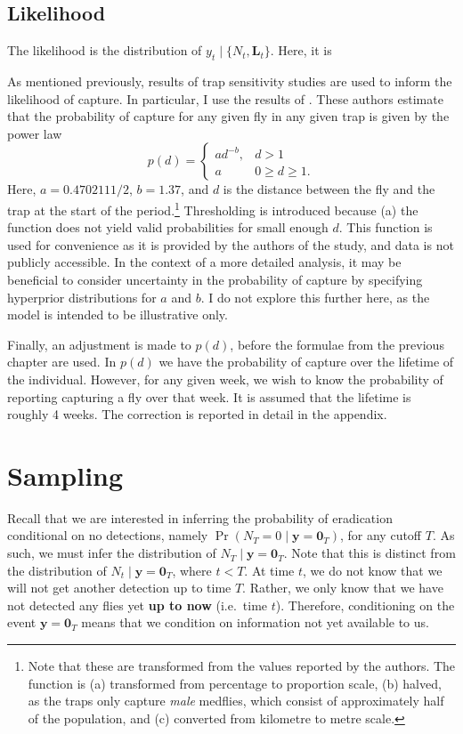 \documentclass[
  oneside]{book}
\begin{document}
\hypertarget{likelihood}{%
\subsection{Likelihood}\label{likelihood}}

The likelihood is the distribution of \(y_t \mid \{N_t, \mathbf L_t\}\). Here, it is

As mentioned previously, results of trap sensitivity studies are used to inform the likelihood of capture. In particular, I use the results of \citet{ms2005}. These authors estimate that the probability of capture for any given fly in any given trap is given by the power law
\[
p(d) = \begin{cases}ad^{-b}, & d>1 \\ a & 0 \geq d \geq 1.\end{cases}
\]
Here, \(a = 0.4702111 / 2\), \(b = 1.37\), and \(d\) is the distance between the fly and the trap at the start of the period.\footnote{Note that these are transformed from the values reported by the authors. The function is (a) transformed from percentage to proportion scale, (b) halved, as the traps only capture \emph{male} medflies, which consist of approximately half of the population, and (c) converted from kilometre to metre scale.} Thresholding is introduced because (a) the function does not yield valid probabilities for small enough \(d\). This function is used for convenience as it is provided by the authors of the study, and data is not publicly accessible. In the context of a more detailed analysis, it may be beneficial to consider uncertainty in the probability of capture by specifying hyperprior distributions for \(a\) and \(b\). I do not explore this further here, as the model is intended to be illustrative only.

Finally, an adjustment is made to \(p(d)\), before the formulae from the previous chapter are used. In \(p(d)\) we have the probability of capture over the lifetime of the individual. However, for any given week, we wish to know the probability of reporting capturing a fly over that week. It is assumed that the lifetime is roughly 4 weeks. The correction is reported in detail in the appendix.

\hypertarget{sampling}{%
\section{Sampling}\label{sampling}}

Recall that we are interested in inferring the probability of eradication conditional on no detections, namely \(\Pr(N_T = 0 \mid \mathbf y = \mathbf 0_T)\), for any cutoff \(T\). As such, we must infer the distribution of \(N_T \mid \mathbf y = \mathbf 0_T\). Note that this is distinct from the distribution of \(N_t \mid \mathbf y = \mathbf 0_T\), where \(t<T\). At time \(t\), we do not know that we will not get another detection up to time \(T\). Rather, we only know that we have not detected any flies yet \textbf{up to now} (i.e.~time \(t\)). Therefore, conditioning on the event \(\mathbf y = \mathbf 0_T\) means that we condition on information not yet available to us.
\end{document}
